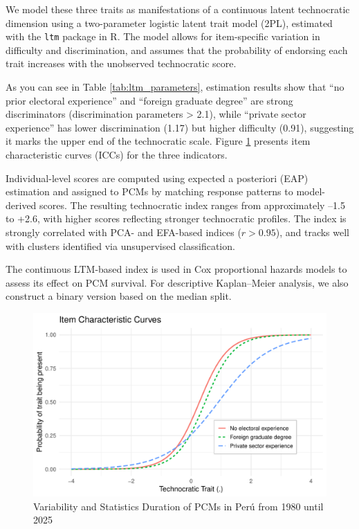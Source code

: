\documentclass[a4paper, 12pt]{article}
\begin{document}
We model these three traits as manifestations of a continuous latent technocratic dimension using a two-parameter logistic latent trait model (2PL), estimated with the \texttt{ltm} package in R. The model allows for item-specific variation in difficulty and discrimination, and assumes that the probability of endorsing each trait increases with the unobserved technocratic score.

As you can see in Table \ref{tab:ltm_parameters}, estimation results show that “no prior electoral experience” and “foreign graduate degree” are strong discriminators (discrimination parameters > 2.1), while “private sector experience” has lower discrimination (1.17) but higher difficulty (0.91), suggesting it marks the upper end of the technocratic scale. Figure \ref{fig:iccplot} presents item characteristic curves (ICCs) for the three indicators.

Individual-level scores are computed using expected a posteriori (EAP) estimation and assigned to PCMs by matching response patterns to model-derived scores. The resulting technocratic index ranges from approximately --1.5 to +2.6, with higher scores reflecting stronger technocratic profiles. The index is strongly correlated with PCA- and EFA-based indices ($r > 0.95$), and tracks well with clusters identified via unsupervised classification.

The continuous LTM-based index is used in Cox proportional hazards models to assess its effect on PCM survival. For descriptive Kaplan–Meier analysis, we also construct a binary version based on the median split.



\begin{figure}[ht]
\centering
\includegraphics[width=\textwidth]{iccplot.pdf}
\caption{Variability and Statistics Duration of PCMs in Perú from 1980 until 2025}  
\label{fig:iccplot} 
\end{figure}
\end{document}
